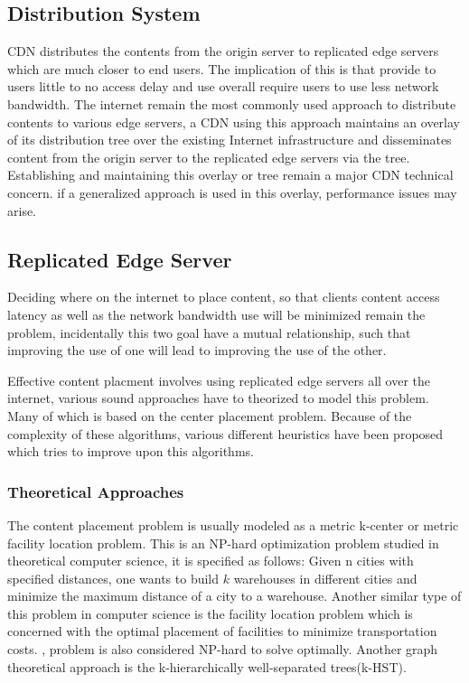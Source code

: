 \subsection{Distribution System}
CDN distributes the contents from the origin server to replicated edge servers which are much closer to end users. The implication of this is that provide to users little to no access delay and use overall require users to use less network bandwidth.  The internet remain the most commonly used approach to distribute contents to various edge servers, a CDN using this approach maintains an overlay of its distribution tree over the existing Internet infrastructure and disseminates content from the origin server to the replicated edge servers via the tree. Establishing and maintaining this overlay or tree remain a major CDN technical concern. if a generalized approach is used in this overlay, performance issues may arise. 

\subsection{Replicated Edge Server }
Deciding where on the internet to place content, so that clients content access latency as well as the network bandwidth use will be minimized remain the problem, incidentally this two goal have a mutual relationship, such that improving the use of one will lead to improving the use of the other. 

Effective content placment  involves using replicated edge servers all over the internet, various sound approaches have to theorized to model this problem. Many of which is based on the center placement problem.  Because of the complexity of these algorithms, various different heuristics have been proposed which tries to improve upon this algorithms. 

\subsubsection{Theoretical Approaches}
The content placement problem is usually modeled as a metric k-center or metric facility location problem.  This is an NP-hard optimization problem studied in theoretical computer science, it is specified as follows:  Given n cities with specified distances, one wants to build ${k}$ warehouses in different cities and minimize the maximum distance of a city to a warehouse.\cite{jaminplacement}  Another similar type of this problem in computer science is the facility location problem which is concerned with the optimal placement of facilities to minimize transportation costs. \cite{qiuplacement}, problem is also considered NP-hard to solve optimally. Another graph theoretical approach is the k-hierarchically well-separated trees(k-HST)\cite{bartalprobabilistic}\cite{jaminplacement}.

